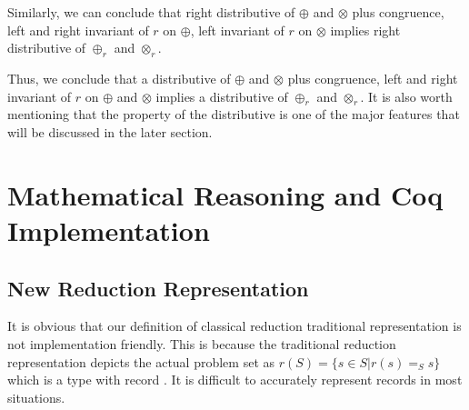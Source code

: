 \documentclass[a4paper,12pt,twoside,openright]{report}
\begin{document}
Similarly, we can conclude that right distributive of $\oplus$ and $\otimes$ plus congruence, left and right invariant of $r$ on $\oplus$, left invariant of $r$ on $\otimes$ implies right distributive of $\oplus_r$ and $\otimes_r$.

Thus, we conclude that a distributive of $\oplus$ and $\otimes$ plus congruence, left and right invariant of $r$ on $\oplus$ and $\otimes$ implies a distributive of $\oplus_r$ and $\otimes_r$.
It is also worth mentioning that the property of the distributive is one of the major features that will be discussed in the later section.

%
%
%

\chapter{Mathematical Reasoning and Coq Implementation} 


\section{New Reduction Representation}
It is obvious that our definition of classical reduction traditional representation is not implementation friendly.
This is because the traditional reduction representation depicts the actual problem set as $r(S) = \{s\in S|r(s)=_S s\}$ which is a type with record . It is difficult to accurately represent records in most situations. 
\end{document}
